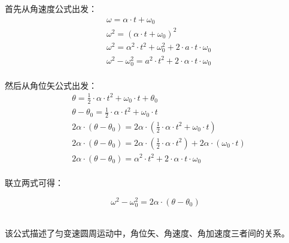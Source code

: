 \documentclass[UTF8]{ctexart}
\begin{document}
    首先从角速度公式出发：
    \begin{align}
        &\omega=\alpha\cdot t+\omega_0\\[3mm]
        &\omega^2=(\alpha\cdot t+\omega_0)^2\\[3mm]
        &\omega^2=\alpha^2\cdot t^2+\omega_0^2+2\cdot a\cdot t\cdot \omega_0\\[3mm]
        &\omega^2-\omega_0^2=a^2\cdot t^2+2\cdot \alpha\cdot t\cdot \omega_0
    \end{align}\\
    然后从角位矢公式出发：
    \begin{align}
        &\theta=\frac{1}{2}\cdot \alpha\cdot t^2+\omega_0\cdot t+\theta_0\\[3mm]
        &\theta-\theta_0=\frac{1}{2}\cdot \alpha\cdot t^2+\omega_0\cdot t\\[3mm]
        &2\alpha\cdot(\theta-\theta_0)=2\alpha\cdot\left(\frac{1}{2}\cdot \alpha\cdot t^2+\omega_0\cdot t\right)\\[3mm]
        &2\alpha\cdot(\theta-\theta_0)=2\alpha\cdot\left(\frac{1}{2}\cdot \alpha\cdot t^2\right)+2\alpha\cdot\left(\omega_0\cdot t\right)\\[3mm]
        &2\alpha\cdot(\theta-\theta_0)=\alpha^2\cdot t^2+2\cdot \alpha\cdot t\cdot \omega_0
    \end{align}\\
    联立两式可得：
    \begin{large}
        \begin{equation*}
            \omega^2-\omega_0^2=2\alpha\cdot\left(\theta-\theta_0\right)
        \end{equation*}
    \end{large}\\
    该公式描述了匀变速圆周运动中，角位矢、角速度、角加速度三者间的关系。

\newpage
\end{document}
